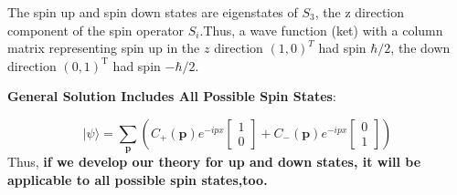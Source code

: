 The spin up and spin down states are eigenstates of $S_3$, the z direction component of the spin operator $S_i$.Thus, a wave function (ket) with a column matrix representing spin up in the $z$ direction $(1,0)^{T}$ had spin $\hbar / 2$, the down direction $(0,1)^{\mathrm{T}}$ had spin $-\hbar / 2$. 

\begin{qt}
\textbf{General Solution Includes All Possible Spin States}:

\begin{equation}
|\psi\rangle=\sum_{\mathbf{p}}\left(C_{+}(\mathbf{p}) e^{-i p x}\left[\begin{array}{l}
{1} \\
{0}
\end{array}\right]+C_{-}(\mathbf{p}) e^{-i p x}\left[\begin{array}{l}
{0} \\
{1}
\end{array}\right]\right)
\end{equation}
Thus, \textbf{if we develop our theory for up and down states, it will be applicable to all possible spin states,too.}
\end{qt}